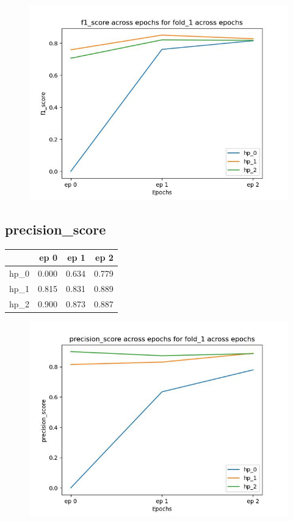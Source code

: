 \documentclass{article}
\begin{document}
\begin{figure}[H]
\includegraphics[scale = 0.75]{fold_1/f1_score}
\end{figure}
\subsection{precision\_score}
\begin{tabular}{lrrr}
\toprule
{} &   ep 0 &   ep 1 &   ep 2 \\
\midrule
hp\_0 &  0.000 &  0.634 &  0.779 \\
hp\_1 &  0.815 &  0.831 &  0.889 \\
hp\_2 &  0.900 &  0.873 &  0.887 \\
\bottomrule
\end{tabular}

\begin{figure}[H]
\includegraphics[scale = 0.75]{fold_1/precision_score}
\end{figure}
\end{document}
